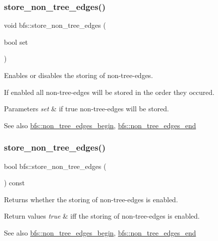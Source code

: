 \subsubsection{\texorpdfstring{store\+\_\+non\+\_\+tree\+\_\+edges()}{store\_non\_tree\_edges()}\hspace{0.1cm}{\footnotesize\ttfamily [1/2]}}
{\footnotesize\ttfamily void bfs\+::store\+\_\+non\+\_\+tree\+\_\+edges (\begin{DoxyParamCaption}\item[{bool}]{set }\end{DoxyParamCaption})}



Enables or disables the storing of non-\/tree-\/edges. 

If enabled all non-\/tree-\/edges will be stored in the order they occured.


\begin{DoxyParams}{Parameters}
{\em set} & if true non-\/tree-\/edges will be stored. \\
\hline
\end{DoxyParams}
\begin{DoxySeeAlso}{See also}
\mbox{\hyperlink{classbfs_a06d02d2643f184b4c086678771f0ff90}{bfs\+::non\+\_\+tree\+\_\+edges\+\_\+begin}}, \mbox{\hyperlink{classbfs_a9fb470cd36eb487004ca28c1723cabda}{bfs\+::non\+\_\+tree\+\_\+edges\+\_\+end}} 
\end{DoxySeeAlso}
\mbox{\label{classbfs_a9fe165e0a6d979d6d55b6234bfbe5b8f}} 
\subsubsection{\texorpdfstring{store\+\_\+non\+\_\+tree\+\_\+edges()}{store\_non\_tree\_edges()}\hspace{0.1cm}{\footnotesize\ttfamily [2/2]}}
{\footnotesize\ttfamily bool bfs\+::store\+\_\+non\+\_\+tree\+\_\+edges (\begin{DoxyParamCaption}{ }\end{DoxyParamCaption}) const\hspace{0.3cm}{\ttfamily [inline]}}



Returns whether the storing of non-\/tree-\/edges is enabled. 


\begin{DoxyRetVals}{Return values}
{\em true} & iff the storing of non-\/tree-\/edges is enabled. \\
\hline
\end{DoxyRetVals}
\begin{DoxySeeAlso}{See also}
\mbox{\hyperlink{classbfs_a06d02d2643f184b4c086678771f0ff90}{bfs\+::non\+\_\+tree\+\_\+edges\+\_\+begin}}, \mbox{\hyperlink{classbfs_a9fb470cd36eb487004ca28c1723cabda}{bfs\+::non\+\_\+tree\+\_\+edges\+\_\+end}} 
\end{DoxySeeAlso}
\mbox{\label{classbfs_a8c7ce0ea2cd8e1932d1da5693d90cf61}} 
